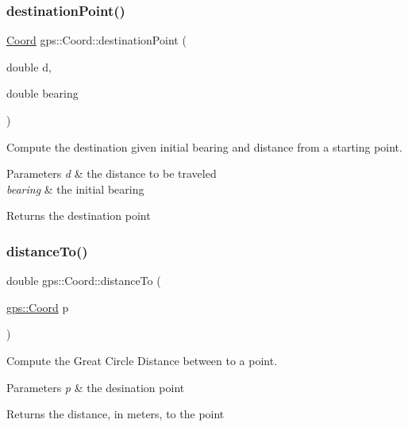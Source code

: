 \subsubsection{\texorpdfstring{destination\+Point()}{destinationPoint()}}
{\footnotesize\ttfamily \hyperlink{classgps_1_1Coord}{Coord} gps\+::\+Coord\+::destination\+Point (\begin{DoxyParamCaption}\item[{double}]{d,  }\item[{double}]{bearing }\end{DoxyParamCaption})}

Compute the destination given initial bearing and distance from a starting point. 
\begin{DoxyParams}{Parameters}
{\em d} & the distance to be traveled \\
\hline
{\em bearing} & the initial bearing \\
\hline
\end{DoxyParams}
\begin{DoxyReturn}{Returns}
the destination point 
\end{DoxyReturn}
\mbox{\label{classgps_1_1Coord_a335589710eec94e6062323ef5c8994ab}} 
\subsubsection{\texorpdfstring{distance\+To()}{distanceTo()}}
{\footnotesize\ttfamily double gps\+::\+Coord\+::distance\+To (\begin{DoxyParamCaption}\item[{\hyperlink{classgps_1_1Coord}{gps\+::\+Coord}}]{p }\end{DoxyParamCaption})}

Compute the Great Circle Distance between to a point. 
\begin{DoxyParams}{Parameters}
{\em p} & the desination point \\
\hline
\end{DoxyParams}
\begin{DoxyReturn}{Returns}
the distance, in meters, to the point 
\end{DoxyReturn}
\mbox{\label{classgps_1_1Coord_ad832b140a8a39355874e268834d078cd}} 
